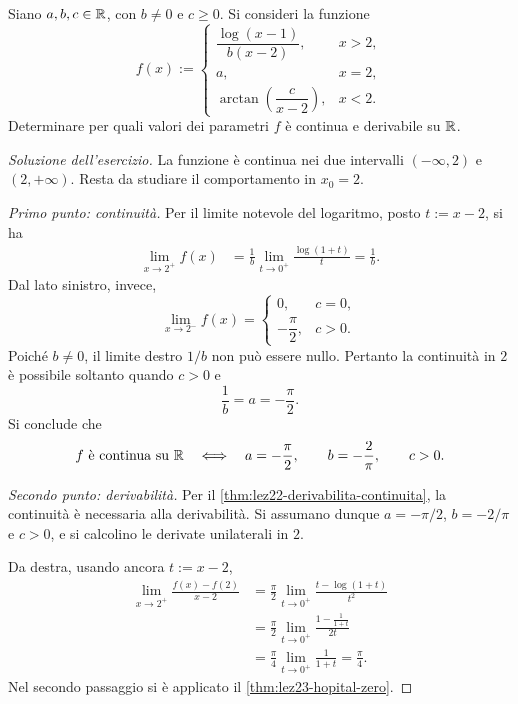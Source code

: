 \begin{exercise}
\label{ex:lez23-continuita-derivabilita-tratti}
Siano \(a,b,c\in\mathbb{R}\), con \(b\ne0\) e \(c\ge0\).
Si consideri la funzione
\[
  f(x):=
  \begin{cases}
    \dfrac{\log(x-1)}{b(x-2)}, & x>2,\\[6pt]
    a, & x=2,\\[4pt]
    \arctan\!\left(\dfrac{c}{x-2}\right), & x<2.
  \end{cases}
\]
Determinare per quali valori dei parametri
\(f\) è continua e derivabile su \(\mathbb{R}\).
\end{exercise}

\begin{proof}[Soluzione dell'esercizio]
La funzione è continua nei due intervalli
\((-\infty,2)\) e \((2,+\infty)\).
Resta da studiare il comportamento in \(x_0=2\).

\emph{Primo punto: continuità.}
Per il limite notevole del logaritmo,
posto \(t:=x-2\), si ha
\[
\begin{aligned}
  \lim_{x\to2^+}f(x)
  &=\frac1b\lim_{t\to0^+}\frac{\log(1+t)}t
   =\frac1b.
\end{aligned}
\]
Dal lato sinistro, invece,
\[
  \lim_{x\to2^-}f(x)
  =\begin{cases}
    0, & c=0,\\[2pt]
    -\dfrac\pi2, & c>0.
  \end{cases}
\]
Poiché \(b\ne0\), il limite destro \(1/b\)
non può essere nullo. Pertanto la continuità
in \(2\) è possibile soltanto quando \(c>0\)
e
\[
  \frac1b=a=-\frac\pi2.
\]
Si conclude che
\[
  f\text{ è continua su }\mathbb{R}
  \quad\Longleftrightarrow\quad
  a=-\frac\pi2,\qquad b=-\frac2\pi,\qquad c>0.
\]

\emph{Secondo punto: derivabilità.}
Per il \cref{thm:lez22-derivabilita-continuita},
la continuità è necessaria alla derivabilità.
Si assumano dunque \(a=-\pi/2\), \(b=-2/\pi\)
e \(c>0\), e si calcolino le derivate unilaterali
in \(2\).

Da destra, usando ancora \(t:=x-2\),
\[
\begin{aligned}
  \lim_{x\to2^+}\frac{f(x)-f(2)}{x-2}
  &=\frac\pi2\lim_{t\to0^+}
    \frac{t-\log(1+t)}{t^2}\\
  &=\frac\pi2\lim_{t\to0^+}
    \frac{1-\frac1{1+t}}{2t}\\
  &=\frac\pi4\lim_{t\to0^+}\frac1{1+t}
   =\frac\pi4.
\end{aligned}
\]
Nel secondo passaggio si è applicato il
\cref{thm:lez23-hopital-zero}.


\end{proof}
